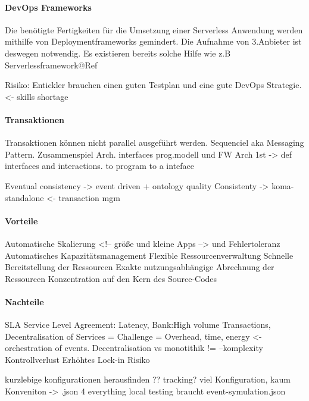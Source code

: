 \documentclass[
12pt,
english,
ngerman,
headsepline,
twoside,
openright,
numbers=noenddot,version=first
]{scrreprt}
\begin{document}
\paragraph{DevOps Frameworks}
Die benötigte Fertigkeiten für die Umsetzung einer Serverless Anwendung werden mithilfe von Deploymentframeworks gemindert. Die Aufnahme von 3.Anbieter ist deswegen notwendig. Es existieren bereits solche Hilfe wie z.B Serverlessframework@Ref

Risiko:
Entickler brauchen einen guten Testplan und eine gute DevOps Strategie.<- skills shortage

\paragraph{Transaktionen}
Transaktionen können nicht parallel ausgeführt werden. Sequenciel aka Messaging Pattern.
Zusammenspiel Arch. interfaces prog.modell und FW
Arch 1st -> def interfaces and interactions. to program to a inteface


Eventual consistency -> event driven + ontology quality
Consistenty -> koma-standalone <- transaction mgm

\paragraph{Vorteile}
Automatische Skalierung <!-- größe und kleine Apps --> und Fehlertoleranz
Automatisches Kapazitätsmanagement
Flexible Ressourcenverwaltung
Schnelle Bereitstellung der Ressourcen
Exakte nutzungsabhängige Abrechnung der Ressourcen
Konzentration auf den Kern des Source-Codes


\paragraph{Nachteile}


SLA Service Level Agreement: Latency, Bank:High volume Transactions,
Decentralisation of Services = Challenge = Overhead, time, energy <- orchestration of events.
Decentralisation vs monotithik != --komplexity
Kontrollverlust
Erhöhtes Lock-in Risiko

kurzlebige konfigurationen herausfinden ?? tracking?
viel Konfiguration, kaum Konveniton -> .json 4 everything
local testing braucht event-symulation.json
\end{document}
